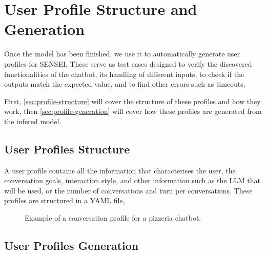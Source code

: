 
\chapter{User Profile Structure and Generation}\label{chapter:user_profiles}

Once the model has been finished,
we use it to automatically generate user profiles for SENSEI.
These serve as test cases designed to verify
the discovered functionalities of the chatbot,
its handling of different inputs,
to check if the outputs match the expected value,
and to find other errors such as timeouts.

First, \autoref{sec:profile-structure}
will cover the structure of these profiles and how they work,
then \autoref{sec:profile-generation}
will cover how these profiles are generated from the infered model.


\section{User Profiles Structure}\label{sec:profile-structure}

A user profile contains all the information
that characterises the user,
the conversation goals,
interaction style,
and other information such as the \ac{LLM} that will be used,
or the number of conversations and turn per conversations.
These profiles are structured in a YAML file,

\begin{figure}[htpb]
  \centering
  
  \caption[Example of a conversation profile for a pizzeria chatbot.]{Example of a conversation profile for a pizzeria chatbot.}\label{lst:user_profile}
\end{figure}

\section{User Profiles Generation}\label{sec:profile-generation}
